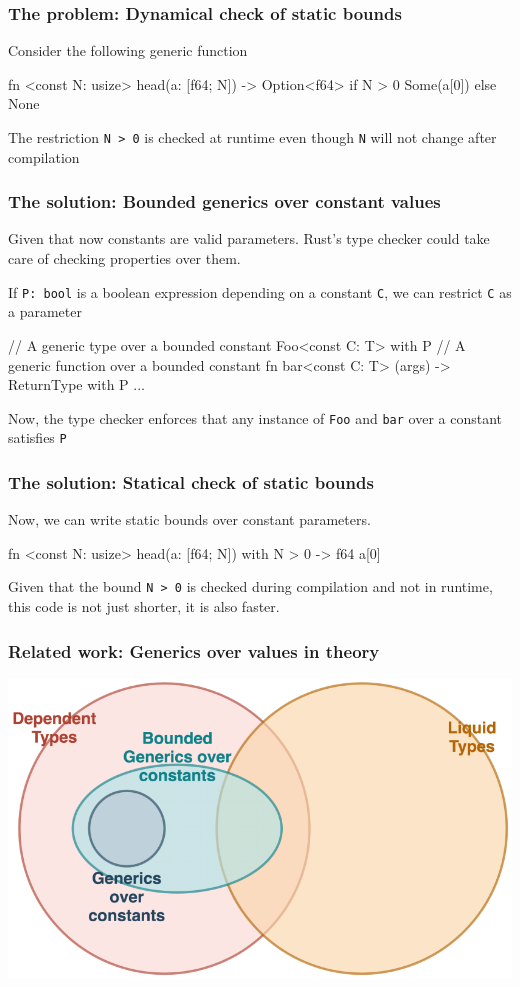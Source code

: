 \documentclass{beamer}
\newcommand{\code}[1] {\texttt{\footnotesize #1}}
\begin{document}
\begin{frame}[fragile]
    \frametitle{The problem: Dynamical check of static bounds}
    Consider the following generic function
    \begin{rustcode}
        fn <const N: usize> head(a: [f64; N]) -> Option<f64> {
            if N > 0 {
                Some(a[0])
            } else {
                None
            }
        }
    \end{rustcode}
    The restriction \code{N > 0} is checked at runtime even though \code{N} will not change after compilation
\end{frame}

\begin{frame}[fragile]
    \frametitle{The solution: Bounded generics over constant values}
    Given that now constants are valid parameters. Rust's type checker could take care of checking properties over them.

    If \code{P: bool} is a boolean expression depending on a constant \code{C}, we can restrict \code{C} as a parameter
    \begin{rustcode}
        // A generic type over a bounded constant
        Foo<const C: T> with P
        // A generic function over a bounded constant
        fn bar<const C: T> (args) -> ReturnType with P { ... }
    \end{rustcode}

    Now, the type checker enforces that any instance of \code{Foo} and \code{bar} over a constant satisfies \code{P}
    
\end{frame}

\begin{frame}[fragile]
    \frametitle{The solution: Statical check of static bounds}
    Now, we can write static bounds over constant parameters.
    \begin{rustcode}
        fn <const N: usize> head(a: [f64; N]) with {N > 0} -> f64 {
            a[0]
        }
    \end{rustcode}
    Given that the bound \code{N > 0} is checked during compilation and not in runtime, this code is not just shorter, it is also faster.
\end{frame}

\begin{frame}[fragile]
    \frametitle{Related work: Generics over values in theory}
    \includegraphics[width=\textwidth]{./theory.png}
\end{frame}
\end{document}
